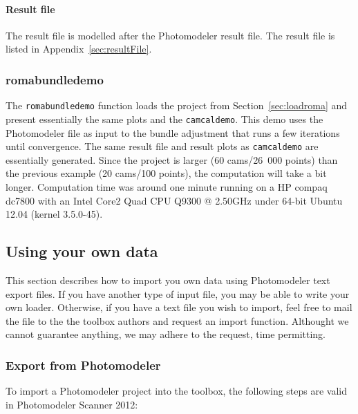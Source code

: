 \documentclass{article}
\begin{document}
\paragraph{Result file}

The result file is modelled after the Photomodeler result file.
The result file is listed in Appendix~\ref{sec:resultFile}.

\subsubsection{romabundledemo}

The \texttt{romabundledemo} function loads the project from
Section~\ref{sec:loadroma} and present essentially the same plots and
the \texttt{camcaldemo}. This demo uses the Photomodeler file as input
to the bundle adjustment that runs a few iterations until convergence.
The same result file and result plots as \texttt{camcaldemo} are
essentially generated. Since the project is larger (60 cams/26~000
points) than the previous example (20 cams/100 points), the
computation will take a bit longer. Computation time was around one
minute running on a HP compaq dc7800 with an Intel Core2 Quad CPU
Q9300 @ 2.50GHz under 64-bit Ubuntu 12.04 (kernel 3.5.0-45).

\subsection{Using your own data}

This section describes how to import you own data using Photomodeler
text export files. If you have another type of input file, you may be
able to write your own loader. Otherwise, if you have a text file you
wish to import, feel free to mail the file to the the toolbox authors
and request an import function. Althought we cannot guarantee
anything, we may adhere to the request, time permitting.

\subsubsection{Export from Photomodeler}

To import a Photomodeler project into the toolbox, the following
steps are valid in Photomodeler Scanner 2012:
\end{document}

